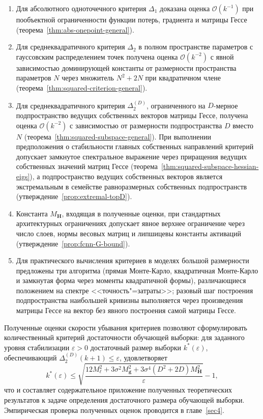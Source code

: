 \begin{enumerate}
    \item Для абсолютного одноточечного критерия $\Delta_1$ доказана оценка $\mathcal O(k^{-1})$ при пообъектной ограниченности функции потерь, градиента и матрицы Гессе (теорема~\ref{thm:abs-onepoint-general}).
    \item Для среднеквадратичного критерия $\Delta_2$ в полном пространстве параметров с гауссовским распределением точек получена оценка $\mathcal O(k^{-2})$ с явной зависимостью доминирующей константы от размерности пространства параметров $N$ через множитель $N^2+2N$ при квадратичном члене (теорема~\ref{thm:squared-criterion-general}).
    \item Для среднеквадратичного критерия $\Delta_2^{(D)}$, ограниченного на $D$-мерное подпространство ведущих собственных векторов матрицы Гессе, получена оценка $\mathcal O(k^{-2})$ с зависимостью от размерности подпространства $D$ вместо $N$ (теорема~\ref{thm:squared-subspace-general}). При выполнении предположения о стабильности главных собственных направлений критерий допускает замкнутое спектральное выражение через приращения ведущих собственных значений матриц Гессе (теорема~\ref{thm:squared-subspace-hessian-eigs}), а подпространство ведущих собственных векторов является экстремальным в семействе равноразмерных собственных подпространств (утверждение~\ref{prop:extremal-topD}).
    \item Константа $M_{\mathbf H}$, входящая в полученные оценки, при стандартных архитектурных ограничениях допускает явное верхнее ограничение через число слоев, нормы весовых матриц и липшицевы константы активаций (утверждение~\ref{prop:fcnn-G-bound}).
    \item Для практического вычисления критериев в моделях большой размерности предложены три алгоритма (прямая Монте-Карло, квадратичная Монте-Карло и замкнутая форма через моменты квадратичной формы), различающиеся положением на спектре <<точность"=затраты>>; разовый шаг построения подпространства наибольшей кривизны выполняется через произведения матрицы Гессе на вектор без явного построения самой матрицы Гессе.
\end{enumerate}

Полученные оценки скорости убывания критериев позволяют сформулировать количественный критерий достаточности обучающей выборки: для заданного уровня стабилизации $\varepsilon > 0$ достаточный размер выборки $k^*(\varepsilon)$, обеспечивающий $\Delta_2^{(D)}(k+1) \leqslant \varepsilon$, удовлетворяет
\begin{equation}
    \label{eq:sufficient-sample-size}
    k^*(\varepsilon)
    \leqslant
    \sqrt{\frac{12 M_\ell^2 + 3\sigma^2 M_{\mathbf g}^2 + 3\sigma^4(D^2+2D)M_{\mathbf H}^2}{\varepsilon}} - 1,
\end{equation}
что и составляет содержательное приложение полученных теоретических результатов к задаче определения достаточного размера обучающей выборки. Эмпирическая проверка полученных оценок проводится в главе~\ref{sec4}.
